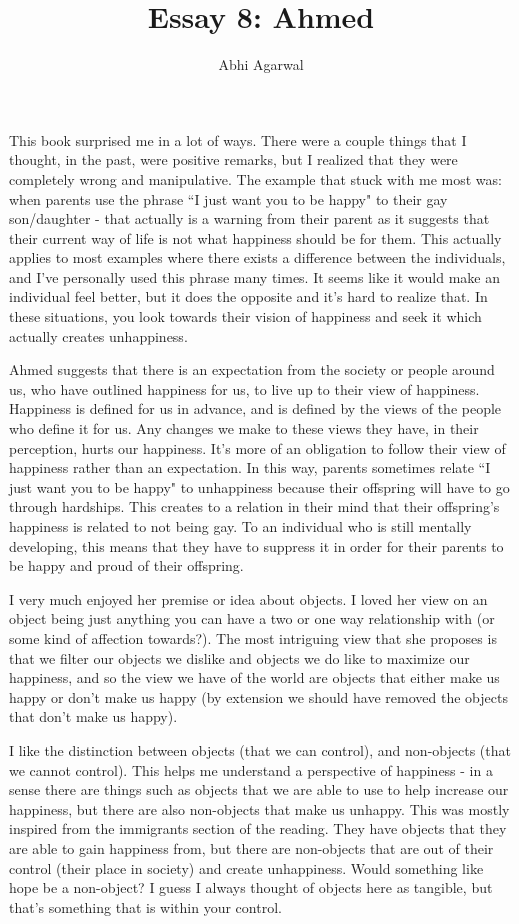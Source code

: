 \documentclass[11pt, oneside]{article}
\title{Essay 8: Ahmed}
\author{Abhi Agarwal}
\date{}
\begin{document}
\maketitle

\par This book surprised me in a lot of ways. There were a couple things that I thought, in the past, were positive remarks, but I realized that they were completely wrong and manipulative. The example that stuck with me most was: when parents use the phrase ``I just want you to be happy" to their gay son/daughter - that actually is a warning from their parent as it suggests that their current way of life is not what happiness should be for them. This actually applies to most examples where there exists a difference between the individuals, and I've personally used this phrase many times. It seems like it would make an individual feel better, but it does the opposite and it's hard to realize that. In these situations, you look towards their vision of happiness and seek it which actually creates unhappiness. 

\par Ahmed suggests that there is an expectation from the society or people around us, who have outlined happiness for us, to live up to their view of happiness. Happiness is defined for us in advance, and is defined by the views of the people who define it for us. Any changes we make to these views they have, in their perception, hurts our happiness. It's more of an obligation to follow their view of happiness rather than an expectation. In this way, parents sometimes relate ``I just want you to be happy" to unhappiness because their offspring will have to go through hardships. This creates to a relation in their mind that their offspring's happiness is related to not being gay. To an individual who is still mentally developing, this means that they have to suppress it in order for their parents to be happy and proud of their offspring.

\par I very much enjoyed her premise or idea about objects. I loved her view on an object being just anything you can have a two or one way relationship with (or some kind of affection towards?). The most intriguing view that she proposes is that we filter our objects we dislike and objects we do like to maximize our happiness, and so the view we have of the world are objects that either make us happy or don't make us happy (by extension we should have removed the objects that don't make us happy). 

\par I like the distinction between objects (that we can control), and non-objects (that we cannot control). This helps me understand a perspective of happiness - in a sense there are things such as objects that we are able to use to help increase our happiness, but there are also non-objects that make us unhappy. This was mostly inspired from the immigrants section of the reading. They have objects that they are able to gain happiness from, but there are non-objects that are out of their control (their place in society) and create unhappiness. Would something like hope be a non-object? I guess I always thought of objects here as tangible, but that's something that is within your control. 
\end{document}
